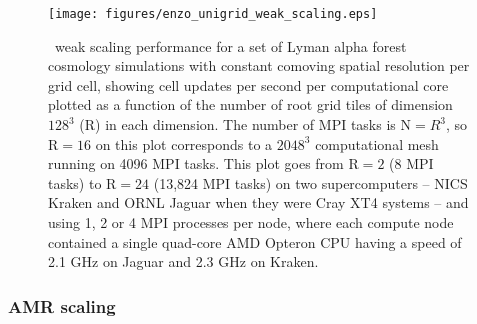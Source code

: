 \begin{figure}
\begin{center}
\texttt{[image: figures/enzo\_unigrid\_weak\_scaling.eps]}
\caption{\enzo\ weak scaling performance for a set of Lyman alpha
forest cosmology simulations with constant comoving spatial resolution
per grid cell, showing cell updates per second per computational core
plotted as a function of the number of root grid tiles of dimension
$128^3$ (R) in each dimension.  The number of MPI tasks is N$ = R^3$,
so R$ = 16$ on this plot corresponds to a $2048^3$ computational mesh
running on 4096 MPI tasks.  This plot goes from R$ = 2$ (8 MPI tasks)
to R$ = 24$ (13,824 MPI tasks) on two supercomputers -- NICS Kraken
and ORNL Jaguar when they were Cray XT4 systems -- and using 1, 2 or 4
MPI processes per node, where each compute node contained a single
quad-core AMD Opteron CPU having a speed of 2.1 GHz on Jaguar and 2.3
GHz on Kraken.}
\label{fig.uniscale}
\end{center}
\end{figure}

\subsubsection{AMR scaling }


